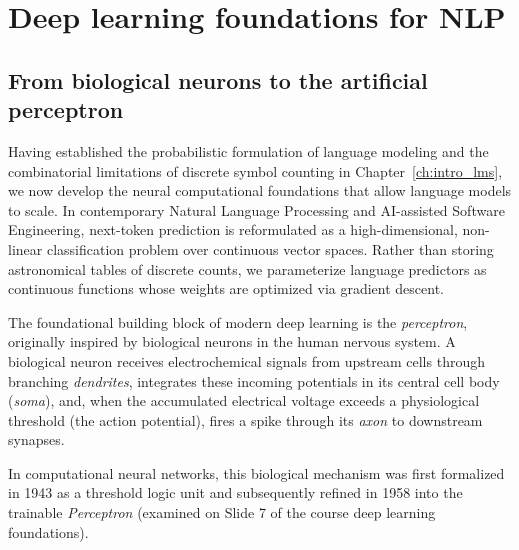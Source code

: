 \documentclass[../../main.tex]{subfiles}
\begin{document}
\chapter{Deep learning foundations for NLP}
\label{ch:deep_learning_foundations}

\section{From biological neurons to the artificial perceptron}
\label{sec:perceptron}

Having established the probabilistic formulation of language modeling and the combinatorial limitations of discrete symbol counting in Chapter~\ref{ch:intro_lms}, we now develop the neural computational foundations that allow language models to scale. In contemporary Natural Language Processing and AI-assisted Software Engineering, next-token prediction is reformulated as a high-dimensional, non-linear classification problem over continuous vector spaces. Rather than storing astronomical tables of discrete counts, we parameterize language predictors as continuous functions whose weights are optimized via gradient descent.

The foundational building block of modern deep learning is the \emph{perceptron}, originally inspired by biological neurons in the human nervous system. A biological neuron receives electrochemical signals from upstream cells through branching \emph{dendrites}, integrates these incoming potentials in its central cell body (\emph{soma}), and, when the accumulated electrical voltage exceeds a physiological threshold (the action potential), fires a spike through its \emph{axon} to downstream synapses.

In computational neural networks, this biological mechanism was first formalized in 1943 \cite{mcculloch1943} as a threshold logic unit and subsequently refined in 1958 \cite{rosenblatt1958} into the trainable \emph{Perceptron} (examined on Slide 7 of the course deep learning foundations).
\end{document}
